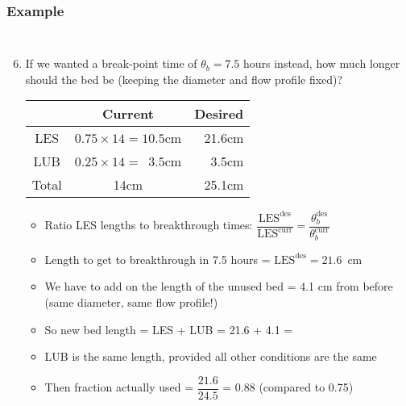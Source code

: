 \begin{frame}\frametitle{Example}
	\vspace{-12pt}
	\begin{columns}[t]
		\begin{enumerate}
			\setcounter{enumi}{5}

			\item	If we wanted a break-point time of $\theta_b = 7.5$ hours instead, how much longer should the bed be {\small (keeping the diameter and flow profile fixed)}?
			
			\begin{center}
				\begin{tabular}{c||c|r}
							&	\textbf{Current}			& \textbf{Desired} \\ \hline
					LES		&	$0.75 \times 14 = 10.5$cm	&	21.6cm \\
					LUB 	&	$0.25 \times 14 = \,\,\,3.5$cm	&	3.5cm\\ \hline
					Total 	&	14cm						&   25.1cm\\
				\end{tabular}
			\end{center}
			
			\begin{itemize}
				\item	Ratio LES lengths to breakthrough times: $ \dfrac{\text{LES}^\text{des}}{\text{LES}^\text{curr}} =  \dfrac{\theta_b^\text{des}}{\theta_b^\text{curr}}$
				\item	Length to get to breakthrough in 7.5 hours = $\text{LES}^\text{des} = 21.6$~cm
				\item	We have to add on the length of the unused bed = 4.1 cm from before (same diameter, same flow profile!)
				\item	So new bed length = LES + LUB = 21.6 + 4.1  = {\color{myOrange}{25.1 cm}}
				\item	LUB is the same length, provided all other conditions are the same
				\item	Then fraction actually used = $\dfrac{21.6}{24.5}$ = 0.88 {\scriptsize (compared to 0.75)}
			\end{itemize}
		\end{enumerate}
	\end{columns}
\end{frame}


